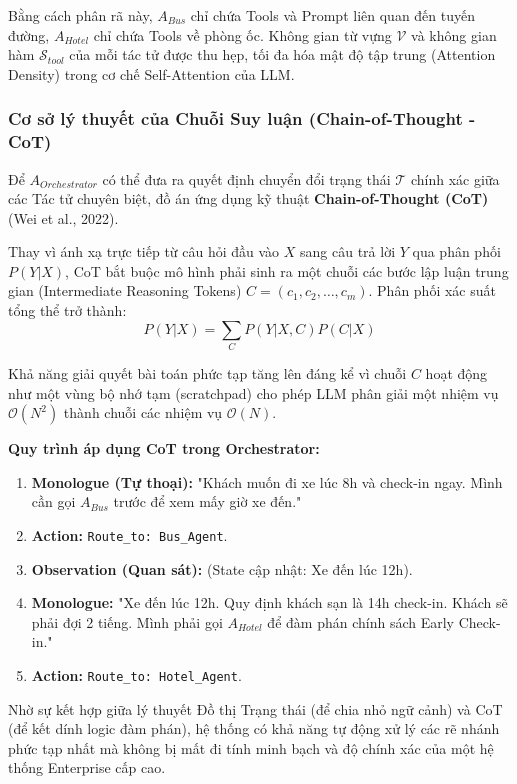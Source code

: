 Bằng cách phân rã này, $A_{Bus}$ chỉ chứa Tools và Prompt liên quan đến tuyến đường, $A_{Hotel}$ chỉ chứa Tools về phòng ốc. Không gian từ vựng $\mathcal{V}$ và không gian hàm $\mathcal{S}_{tool}$ của mỗi tác tử được thu hẹp, tối đa hóa mật độ tập trung (Attention Density) trong cơ chế Self-Attention của LLM.

\subsubsection{Cơ sở lý thuyết của Chuỗi Suy luận (Chain-of-Thought - CoT)}
Để $A_{Orchestrator}$ có thể đưa ra quyết định chuyển đổi trạng thái $\mathcal{T}$ chính xác giữa các Tác tử chuyên biệt, đồ án ứng dụng kỹ thuật \textbf{Chain-of-Thought (CoT)} (Wei et al., 2022). 

Thay vì ánh xạ trực tiếp từ câu hỏi đầu vào $X$ sang câu trả lời $Y$ qua phân phối $P(Y|X)$, CoT bắt buộc mô hình phải sinh ra một chuỗi các bước lập luận trung gian (Intermediate Reasoning Tokens) $C = (c_1, c_2, \dots, c_m)$. Phân phối xác suất tổng thể trở thành:
\begin{equation}
    P(Y|X) = \sum_{C} P(Y|X, C) P(C|X)
\end{equation}

Khả năng giải quyết bài toán phức tạp tăng lên đáng kể vì chuỗi $C$ hoạt động như một vùng bộ nhớ tạm (scratchpad) cho phép LLM phân giải một nhiệm vụ $\mathcal{O}(N^2)$ thành chuỗi các nhiệm vụ $\mathcal{O}(N)$. 

\textbf{Quy trình áp dụng CoT trong Orchestrator:}
\begin{enumerate}
    \item \textbf{Monologue (Tự thoại):} "Khách muốn đi xe lúc 8h và check-in ngay. Mình cần gọi $A_{Bus}$ trước để xem mấy giờ xe đến."
    \item \textbf{Action:} \texttt{Route\_to: Bus\_Agent}.
    \item \textbf{Observation (Quan sát):} (State cập nhật: Xe đến lúc 12h).
    \item \textbf{Monologue:} "Xe đến lúc 12h. Quy định khách sạn là 14h check-in. Khách sẽ phải đợi 2 tiếng. Mình phải gọi $A_{Hotel}$ để đàm phán chính sách Early Check-in."
    \item \textbf{Action:} \texttt{Route\_to: Hotel\_Agent}.
\end{enumerate}

Nhờ sự kết hợp giữa lý thuyết Đồ thị Trạng thái (để chia nhỏ ngữ cảnh) và CoT (để kết dính logic đàm phán), hệ thống có khả năng tự động xử lý các rẽ nhánh phức tạp nhất mà không bị mất đi tính minh bạch và độ chính xác của một hệ thống Enterprise cấp cao.
